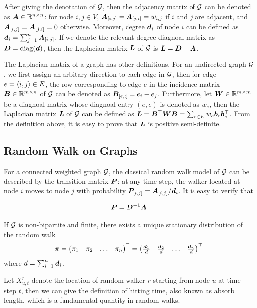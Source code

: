 \documentclass[sigconf]{acmart}
\begin{document}
After giving the denotation of \(\mathcal{G}\), then the adjacency matrix of \(\mathcal{G}\) can be denoted as \(\boldsymbol{A}\in \mathbb{R}^{n\times n}\): for node \(i,j\in V\), \(\boldsymbol{A}_{[i,j]}=\boldsymbol{A}_{[j,i]}=w_{i,j}\) if \(i\) and \(j\) are adjacent, and \(\boldsymbol{A}_{[i,j]}=\boldsymbol{A}_{[j,i]}=0\) otherwise.
Moreover, degree \(\boldsymbol{d}_i\) of node \(i\) can be defined as \(\boldsymbol{d}_i=\sum_{j=1}^n\boldsymbol{A}_{[i,j]}\).
If we denote the relevant degree diagnoal matrix as \(\boldsymbol{D}={\rm{diag}}(\boldsymbol{d})\), then the Laplacian matrix \(\boldsymbol{L}\) of \(\mathcal{G}\) is \(\boldsymbol{L}=\boldsymbol{D}-\boldsymbol{A}\).

The Laplacian matrix of a graph has other definitions.
For an undirected graph \(\mathcal{G}\), we first assign an arbitary direction to each edge in \(\mathcal{G}\), then for edge \(e=\langle i, j \rangle\in E\), the row corresponding to edge \(e\) in the incidence matrix \(\boldsymbol{B}\in\mathbb{R}^{m\times n}\) of \(\mathcal{G}\) can be denoted as \(\boldsymbol{B}_{[e,:]}=e_i-e_j\).
Furthermore, let \(\boldsymbol{W}\in\mathbb{R}^{m\times m}\) be a diagnoal matrix whose diagnoal entry \((e,e)\) is denoted as \(w_e\), then the Laplacian matrix \(\boldsymbol{L}\) of \(\mathcal{G}\) can be defined as \(\boldsymbol{L}=\boldsymbol{B}^\top\boldsymbol{W}\boldsymbol{B}=\sum_{e\in E}w_e\boldsymbol{b}_e\boldsymbol{b}_e^\top\).
From the definition above, it is easy to prove that \(\boldsymbol{L}\) is positive semi-definite.

\subsection{Random Walk on Graphs}

For a connected weighted graph \(\mathcal{G}\), the classical random walk model of \(\mathcal{G}\) can be described by the transition matrix \(\boldsymbol{P}\): at any time step, the walker located at node \(i\) moves to node \(j\) with probability \({\boldsymbol{P}_{[i,j]}=\boldsymbol{A}_{[i,j]}}/{\boldsymbol{d}}_i\).
It is easy to verify that

\begin{equation}\label{eq:trs}
    \boldsymbol{P}=\boldsymbol{D}^{-1}\boldsymbol{A}
\end{equation}

If \(\mathcal{G}\) is non-bipartite and finite, there exists a unique stationary distribution of the random walk
\[
    \boldsymbol{\pi}=\begin{pmatrix}
        \pi_1 & \pi_2 & \dots & \pi_n
    \end{pmatrix}^\top=\begin{pmatrix}
        \frac{\boldsymbol{d}_1}{d} & \frac{\boldsymbol{d}_2}{d} & \dots & \frac{\boldsymbol{d}_n}{d}
    \end{pmatrix}^\top
\]
where \(d=\sum_{i=1}^n\boldsymbol{d}_i\).

Let \(X_{u,t}^r\) denote the location of random walker \(r\) starting from node \(u\) at time step \(t\), then we can give the definition of hitting time, also known as absorb length, which is a fundamental quantity in random walks.
\end{document}
